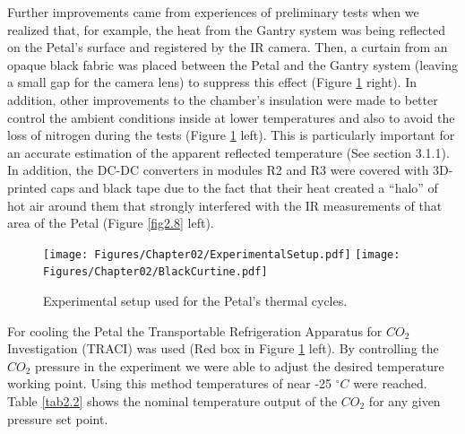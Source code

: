 		Further improvements came from experiences of preliminary tests when we realized that, for example, the heat from the Gantry system was being reflected on the Petal's surface and registered by the IR camera. Then, a curtain from an opaque black fabric was placed between the Petal and the Gantry system (leaving a small gap for the camera lens) to suppress this effect (Figure \ref{fig2.7} right). In addition, other improvements to the chamber's insulation were made to better control the ambient conditions inside at lower temperatures and also to avoid the loss of nitrogen during the tests (Figure \ref{fig2.7} left). This is particularly important for an accurate estimation of the apparent reflected temperature (See section 3.1.1). In addition, the DC-DC converters in modules R2 and R3 were covered with 3D-printed caps and black tape due to the fact that their heat created a “halo” of hot air around them that strongly interfered with the IR measurements of that area of the Petal (Figure \ref{fig2.8} left).
		
		\begin{figure}[ht!]
			\centering
			\captionsetup{justification=centering,margin=2cm}
			\texttt{[image: Figures/Chapter02/ExperimentalSetup.pdf]}
			\texttt{[image: Figures/Chapter02/BlackCurtine.pdf]}
			\caption{Experimental setup used for the Petal's thermal cycles.}\label{fig2.7}
		\end{figure}
		
		For cooling the Petal the Transportable Refrigeration Apparatus for $CO_{2}$ Investigation (TRACI) was used (Red box in Figure \ref{fig2.7} left). By controlling the $CO_{2}$ pressure in the experiment we were able to adjust the desired temperature working point. Using this method temperatures of near -25 $^{\circ}C$ were reached. Table \ref{tab2.2} shows the nominal temperature output of the $CO_{2}$ for any given pressure set point.
		
